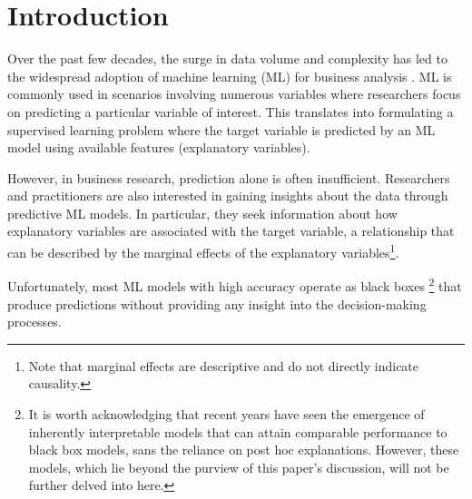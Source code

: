 \documentclass[mnsc,blindrev]{informs3}
\begin{document}
\section{Introduction}

Over the past few decades, the surge in data volume and complexity has led to the widespread adoption of machine learning (ML) for business analysis \citep{kleinberg2015prediction,mullainathan17applied}. ML is commonly used in scenarios involving numerous variables where researchers focus on predicting a particular variable of interest. This translates into formulating a supervised learning problem where the target variable is predicted by an ML model using available features (explanatory variables).

However, in business research, prediction alone is often insufficient. Researchers and practitioners are also interested in gaining insights about the data through predictive ML models. In particular, they seek information about how explanatory variables are associated with the target variable, a relationship that can be described by the marginal effects of the explanatory variables\footnote{Note that marginal effects are descriptive and do not directly indicate causality.}. 

Unfortunately, most ML models with high accuracy operate as black boxes \footnote{It is worth acknowledging that recent years have seen the emergence of inherently interpretable models that can attain comparable performance to black box models, sans the reliance on post hoc explanations. However, these models, which lie beyond the purview of this paper's discussion, will not be further delved into here.} that produce predictions without providing any insight into the decision-making processes.
\end{document}
